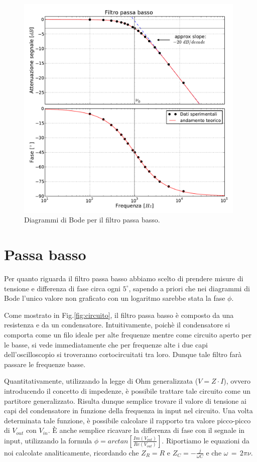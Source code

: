 \begin{figure}
    \includegraphics[width=110mm]{low.pdf}
    \caption{Diagrammi di Bode per il filtro passa basso.}
    \label{fig:low}
\end{figure}
\section{Passa basso}
Per quanto riguarda il filtro passa basso abbiamo scelto di prendere misure di tensione e differenza di fase circa ogni $5^{\circ}$, sapendo a priori che nei diagrammi di Bode l'unico valore non graficato con un logaritmo sarebbe stata la fase $\phi$.

Come mostrato in Fig.\ref{fig:circuito}, il filtro passa basso è composto da una resistenza e da un condensatore. Intuitivamente, poichè il condensatore si comporta come un filo ideale per alte frequenze mentre come circuito aperto per le basse, si vede immediatamente che per frequenze alte i due capi dell'oscilloscopio si troveranno cortocircuitati tra loro. Dunque tale filtro farà passare le frequenze basse.

Quantitativamente, utilizzando la legge di Ohm generalizzata ($V=Z \cdot I$), ovvero introducendo il concetto di impedenze, è possibile trattare tale circuito come un partitore generalizzato. Risulta dunque semplice trovare il valore di tensione ai capi del condensatore in funzione della frequenza in input nel circuito. Una volta determinata tale funzione, è possibile calcolare il rapporto tra valore picco-picco di $V_{out}$ con $V_{in}$. \`E anche semplice ricavare la differenza di fase con il segnale in input, utilizzando la formula $\phi=arctan[\frac{Im(V_{out})}{Re(V_{out})}]$. Riportiamo le equazioni da noi calcolate analiticamente, ricordando che $Z_R=R$ e $Z_C=-\frac{j}{\omega C}$ e che $\omega\,=\,2\pi\nu$.

